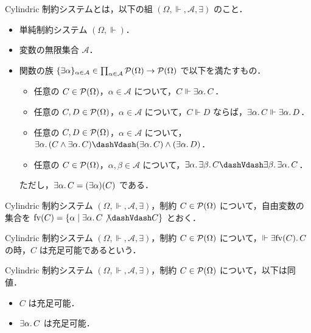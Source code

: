 \begin{definition}
  Cylindric 制約システムとは，以下の組 $(\Omega, \Vdash, \mathcal{A}, \exists)$ のこと．
  \begin{itemize}
    \item 単純制約システム $(\Omega, \Vdash)$．
    \item 変数の無限集合 $\mathcal{A}$．
    \item 関数の族 $\{\exists \alpha\}_{\alpha \in \mathcal{A}} \in \prod_{\alpha \in \mathcal{A}} \mathcal{P}(\Omega) \to \mathcal{P}(\Omega)$ で以下を満たすもの．
    \begin{itemize}
      \item 任意の $C \in \mathcal{P}(\Omega)$，$\alpha \in \mathcal{A}$ について，$C \Vdash \exists \alpha\ldotp C$．
      \item 任意の $C, D \in \mathcal{P}(\Omega)$，$\alpha \in \mathcal{A}$ について，$C \Vdash D$ ならば，$\exists \alpha\ldotp C \Vdash \exists \alpha\ldotp D$．
      \item 任意の $C, D \in \mathcal{P}(\Omega)$，$\alpha \in \mathcal{A}$ について，$\exists \alpha\ldotp (C \land \exists \alpha\ldotp C) \dashVdash (\exists \alpha\ldotp C) \land (\exists \alpha\ldotp D)$．
      \item 任意の $C \in \mathcal{P}(\Omega)$，$\alpha, \beta \in \mathcal{A}$ について，$\exists \alpha\ldotp \exists \beta\ldotp C \dashVdash \exists \beta\ldotp \exists \alpha\ldotp C$．
    \end{itemize}
    ただし，$\exists \alpha\ldotp C = (\exists \alpha)(C)$ である．
  \end{itemize}
\end{definition}

\begin{definition}[自由変数]
  Cylindric 制約システム $(\Omega, \Vdash, \mathcal{A}, \exists)$，制約 $C \in \mathcal{P}(\Omega)$ について，自由変数の集合を $\mathrm{fv}(C) = \{\alpha \mid \exists \alpha\ldotp C \not\dashVdash C\}$ とおく．
\end{definition}

\begin{definition}
  Cylindric 制約システム $(\Omega, \Vdash, \mathcal{A}, \exists)$，制約 $C \in \mathcal{P}(\Omega)$ について，$\Vdash \exists \mathrm{fv}(C)\ldotp C$ の時，$C$ は充足可能であるという．
\end{definition}

\begin{lemma}
  Cylindric 制約システム $(\Omega, \Vdash, \mathcal{A}, \exists)$，制約 $C \in \mathcal{P}(\Omega)$ について，以下は同値．
  \begin{itemize}
    \item $C$ は充足可能．
    \item $\exists \alpha\ldotp C$ は充足可能．
  \end{itemize}
\end{lemma}

